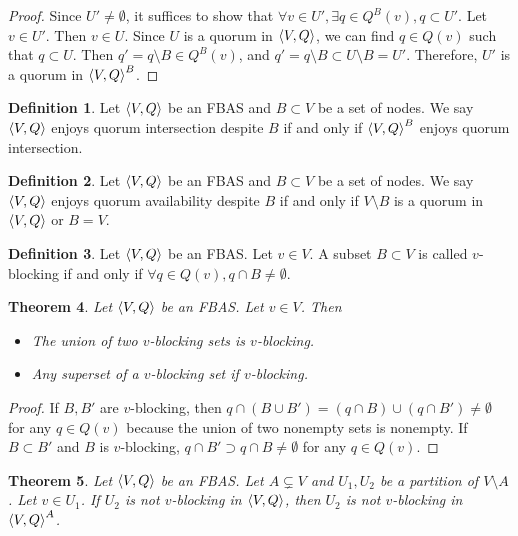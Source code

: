 \documentclass[12pt, psamsfonts]{amsart}
\newtheorem{thm}{Theorem}[section]
\theoremstyle{definition}
\newtheorem{defn}[thm]{Definition}
\theoremstyle{remark}
\numberwithin{equation}{section}
\begin{document}
\begin{proof}
    Since $U' \ne \emptyset$, it suffices to show that $\forall v \in U', \exists q \in Q^B(v), q \subset U'$.
    Let $v \in U'$.
    Then $v \in U$.
    Since $U$ is a quorum in $\ev{V, Q}$, we can find $q \in Q(v)$ such that $q \subset U$.
    Then $q' = q \setminus B \in Q^B(v)$, and $q' = q \setminus B \subset U \setminus B = U'$.
    Therefore, $U'$ is a quorum in $\ev{V, Q}^B$.
\end{proof}

\begin{defn}
    Let $\ev{V, Q}$ be an FBAS and $B \subset V$ be a set of nodes.
    We say $\ev{V, Q}$ enjoys quorum intersection despite $B$ if and only if $\ev{V, Q}^B$ enjoys quorum intersection.
\end{defn}

\begin{defn}\label{def_quorum_availability}
    Let $\ev{V, Q}$ be an FBAS and $B \subset V$ be a set of nodes.
    We say $\ev{V, Q}$ enjoys quorum availability despite $B$ if and only if $V \setminus B$ is a quorum in $\ev{V, Q}$ or $B = V$.
\end{defn}

\begin{defn}\label{def_v_blocking}
    Let $\ev{V, Q}$ be an FBAS\@.
    Let $v \in V$.
    A subset $B \subset V$ is called $v$-blocking if and only if $\forall q \in Q(v), q \cap B \ne \emptyset$.
\end{defn}

\begin{thm}\label{basic_prop_v_blocking}
    Let $\ev{V, Q}$ be an FBAS\@.
    Let $v \in V$.
    Then
    \begin{itemize}
        \item
            The union of two $v$-blocking sets is $v$-blocking.
        \item
            Any superset of a $v$-blocking set if $v$-blocking.
    \end{itemize}
\end{thm}

\begin{proof}
    If $B, B'$ are $v$-blocking, then $q \cap (B \cup B') = (q \cap B) \cup (q \cap B') \ne \emptyset$ for any $q \in Q(v)$ because the union of two nonempty sets is nonempty.
    If $B \subset B'$ and $B$ is $v$-blocking, $q \cap B' \supset q \cap B \ne \emptyset$ for any $q \in Q(v)$.
\end{proof}

\begin{thm}\label{v_blocking_delete}
    Let $\ev{V, Q}$ be an FBAS\@.
    Let $A \subsetneq V$ and $U_1, U_2$ be a partition of $V \setminus A$.
    Let $v \in U_1$.
    If $U_2$ is not $v$-blocking in $\ev{V, Q}$, then $U_2$ is not $v$-blocking in $\ev{V, Q}^A$.
\end{thm}
\end{document}
